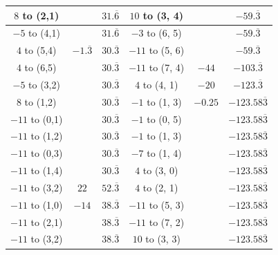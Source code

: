 \begin{appendices}
\begin{table}[H]
\begin{tabular}{cccccc}
          $8$ to (2,1)  &          &  $31.\overline6$     &   $10$ to (3, 4) &                    &  $-59.\overline3$    \\ \hline
          $-5$ to (4,1)  &          &  $31.\overline6$     &   $-3$ to (6, 5) &                    &  $-59.\overline3$    \\ \hline
          $4$ to (5,4)  & $-1.\overline3$  &  $30.\overline3$    &   $-11$ to (5, 6) &                    &  $-59.\overline3$    \\ \hline
          $4$ to (6,5)  &                  &  $30.\overline3$    &   $-11$ to (7, 4) & $-44$                    &  $-103.\overline3$    \\ \hline
          $-5$ to (3,2)  &                  &  $30.\overline3$    &   $4$ to (4, 1) & $-20$                    &  $-123.\overline3$    \\ \hline
          $8$ to (1,2)  &                  &  $30.\overline3$    &   $-1$ to (1, 3) & $-0.25$                    &  $-123.58\overline3$    \\ \hline
          $-11$ to (0,1)  &                  &  $30.\overline3$    &   $-1$ to (0, 5) &                            &  $-123.58\overline3$    \\ \hline
          $-11$ to (1,2)  &                  &  $30.\overline3$    &   $-1$ to (1, 3) &                            &  $-123.58\overline3$    \\ \hline
          $-11$ to (0,3)  &                  &  $30.\overline3$    &   $-7$ to (1, 4) &                            &  $-123.58\overline3$    \\ \hline
          $-11$ to (1,4)  &                  &  $30.\overline3$    &   $4$ to (3, 0) &                            &  $-123.58\overline3$    \\ \hline
          $-11$ to (3,2)  & $22$                  &  $52.\overline3$    &   $4$ to (2, 1) &                            &  $-123.58\overline3$    \\ \hline
          $-11$ to (1,0)  & $-14$                  &  $38.\overline3$    &   $-11$ to (5, 3) &                            &  $-123.58\overline3$    \\ \hline
          $-11$ to (2,1)  &                        &  $38.\overline3$    &   $-11$ to (7, 2) &                            &  $-123.58\overline3$    \\ \hline
          $-11$ to (3,2)  &                        &  $38.\overline3$    &   $10$ to (3, 3) &                            &  $-123.58\overline3$    \\ \hline

\end{tabular}
\end{table}
\end{appendices}
